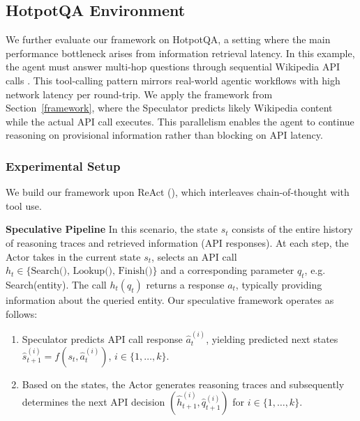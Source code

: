 \subsection{HotpotQA Environment}
\label{subsec:hotpotqa}
We further evaluate our framework on HotpotQA, a setting where the main performance bottleneck arises from information retrieval latency. In this example, the agent must answer multi-hop questions through sequential Wikipedia API calls \cite{yang2018hotpotqadatasetdiverseexplainable}. This tool-calling pattern mirrors real-world agentic workflows with high network latency per round-trip. We apply the framework from Section~\ref{framework}, where the Speculator predicts likely Wikipedia content while the actual API call executes. This parallelism enables the agent to continue reasoning on provisional information rather than blocking on API latency.


\subsubsection{Experimental Setup}
We build our framework upon ReAct (\cite{yao2023reactsynergizingreasoningacting}), which interleaves chain-of-thought with tool use.

\textbf{Speculative Pipeline} In this scenario, the state $s_t$ consists of the entire history of reasoning traces and retrieved information (API responses). At each step, the Actor takes in the current state $s_t$,  selects an API call $h_t \in\{\text{Search(), Lookup(), Finish()}\}$ and a corresponding parameter $q_t$, e.g. Search(entity). The call $h_t(q_t)$ returns a response $a_t$, typically providing information about the queried entity. Our speculative framework operates as follows:
\begin{enumerate}[leftmargin=*]
    \item Speculator predicts API call response $\hat{a}_t^{(i)}$, yielding predicted next states $\hat{s}_{t+1}^{(i)} = f(s_t,\hat{a}_t^{(i)})$, $i\in\{1,\dots,k\}$.
    \item Based on the states, the Actor generates reasoning traces and subsequently determines the next API decision $(\hat{h}_{t+1}^{(i)}, \hat{q}_{t+1}^{(i)})$ for $i\in\{1,\dots,k\}$.
\end{enumerate}







